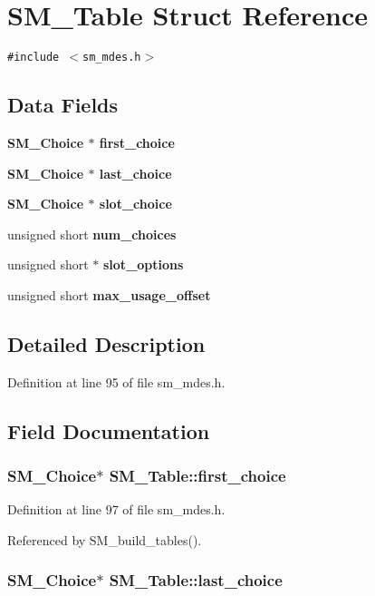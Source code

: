 \section{SM\_\-Table Struct Reference}
\label{structSM__Table}
{\tt \#include $<$sm\_\-mdes.h$>$}

\subsection*{Data Fields}
\begin{CompactItemize}
\item 
\bf{SM\_\-Choice} $\ast$ \bf{first\_\-choice}
\item 
\bf{SM\_\-Choice} $\ast$ \bf{last\_\-choice}
\item 
\bf{SM\_\-Choice} $\ast$ \bf{slot\_\-choice}
\item 
unsigned short \bf{num\_\-choices}
\item 
unsigned short $\ast$ \bf{slot\_\-options}
\item 
unsigned short \bf{max\_\-usage\_\-offset}
\end{CompactItemize}


\subsection{Detailed Description}




Definition at line 95 of file sm\_\-mdes.h.

\subsection{Field Documentation}
\subsubsection{\setlength{\rightskip}{0pt plus 5cm}\bf{SM\_\-Choice}$\ast$ \bf{SM\_\-Table::first\_\-choice}}\label{structSM__Table_0adba2f1b2d467a3c9f4e69e19e1c074}




Definition at line 97 of file sm\_\-mdes.h.

Referenced by SM\_\-build\_\-tables().
\subsubsection{\setlength{\rightskip}{0pt plus 5cm}\bf{SM\_\-Choice}$\ast$ \bf{SM\_\-Table::last\_\-choice}}\label{structSM__Table_a335742f5b2c7a5084f8e8b40ed87dec}




